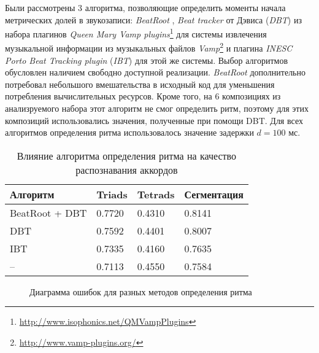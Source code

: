 Были рассмотрены 3 алгоритма, позволяющие определить моменты начала метрических
долей в звукозаписи: \emph{BeatRoot} \cite{Dixon2007}, \emph{Beat tracker} от
Дэвиса \cite{Davies2007} (\emph{DBT}) из набора плагинов \emph{Queen Mary Vamp
plugins}\footnote{\url{http://www.isophonics.net/QMVampPlugins}} для системы
извлечения музыкальной информации из музыкальных файлов
\emph{Vamp}\footnote{\url{http://www.vamp-plugins.org/}} и плагина \emph{INESC
Porto Beat Tracking plugin} \cite{Oliveira2012} (\emph{IBT}) для этой же
системы. Выбор алгоритмов обусловлен наличием свободно доступной реализации.
\emph{BeatRoot} дополнительно потребовал небольшого вмешательства в исходный
код для уменьшения потребления вычислительных ресурсов. Кроме того, на 6
композициях из анализруемого набора этот алгоритм не смог определить ритм,
поэтому для этих композиций использовались значения, полученные при помощи DBT.
Для всех алгоритмов определения ритма использовалось значение задержки $d=100$
мс.

\begin{table} [htbp]
  \centering
  \parbox{15cm}{\caption{Влияние алгоритма определения ритма на
  качество распознавания аккордов} \label{TBT}}
  \begin{tabular}{|l|l|l|l|}
  \hline
  Алгоритм & Triads & Tetrads & Сегментация \\
  \hline
  BeatRoot + DBT & 0.7720 & 0.4310 & 0.8141 \\
  DBT & 0.7592 & 0.4401 & 0.8007 \\
  IBT & 0.7335 & 0.4160 & 0.7635 \\
  -- & 0.7113 & 0.4550 & 0.7584 \\
  \hline
  \end{tabular}
\end{table}

\begin{figure}[h]
  \begin{minipage}[h]{0.49\linewidth}
  \end{minipage}
  \hfill
  \begin{minipage}[h]{0.49\linewidth}
  \end{minipage}
  \caption{Диаграмма ошибок для разных методов определения ритма}
  \label{img:beattracker}
\end{figure}

